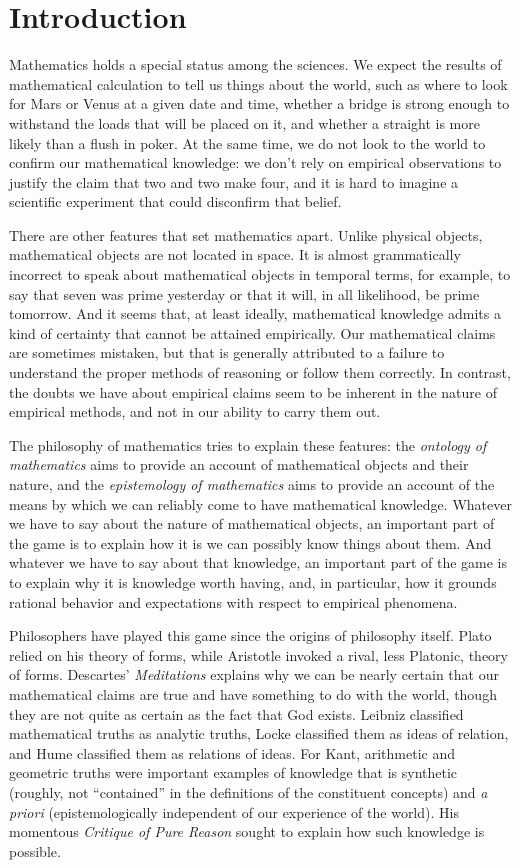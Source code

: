 \documentclass[11pt]{article}
\begin{document}
\section{Introduction}

Mathematics holds a special status among the sciences. We expect the results of mathematical calculation to tell us things about the world, such as where to look for Mars or Venus at a given date and time, whether a bridge is strong enough to withstand the loads that will be placed on it, and whether a straight is more likely than a flush in poker. At the same time, we do not look to the world to confirm our mathematical knowledge: we don't rely on empirical observations to justify the claim that two and two make four, and it is hard to imagine a scientific experiment that could disconfirm that belief. 

There are other features that set mathematics apart. Unlike physical objects, mathematical objects are not located in space. It is almost grammatically incorrect to speak about mathematical objects in temporal terms, for example, to say that seven was prime yesterday or that it will, in all likelihood, be prime tomorrow. And it seems that, at least ideally, mathematical knowledge admits a kind of certainty that cannot be attained empirically. Our mathematical claims are sometimes mistaken, but that is generally attributed to a failure to understand the proper methods of reasoning or follow them correctly. In contrast, the doubts we have about empirical claims seem to be inherent in the nature of empirical methods, and not in our ability to carry them out.

The philosophy of mathematics tries to explain these features: the \emph{ontology of mathematics} aims to provide an account of mathematical objects and their nature, and the \emph{epistemology of mathematics} aims to provide an account of the means by which we can reliably come to have mathematical knowledge. Whatever we have to say about the nature of mathematical objects, an important part of the game is to explain how it is we can possibly know things about them. And whatever we have to say about that knowledge, an important part of the game is to explain why it is knowledge worth having, and, in particular, how it grounds rational behavior and expectations with respect to empirical phenomena.

Philosophers have played this game since the origins of philosophy itself. Plato relied on his theory of forms, while Aristotle invoked a rival, less Platonic, theory of forms. Descartes' \emph{Meditations} explains why we can be nearly certain that our mathematical claims are true and have something to do with the world, though they are not quite as certain as the fact that God exists. Leibniz classified mathematical truths as analytic truths, Locke classified them as ideas of relation, and Hume classified them as relations of ideas. For Kant, arithmetic and geometric truths were important examples of knowledge that is synthetic (roughly, not ``contained'' in the definitions of the constituent concepts) and \emph{a priori} (epistemologically independent of our experience of the world). His momentous \emph{Critique of Pure Reason} sought to explain how such knowledge is possible.
\end{document}

